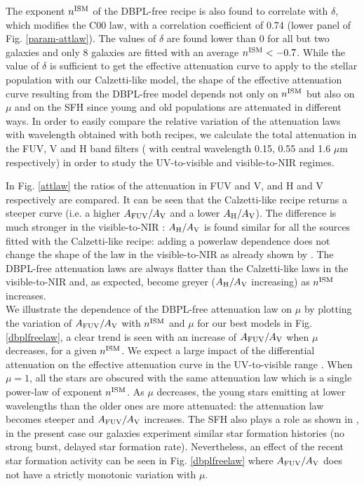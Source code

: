 \documentclass{aa}
\begin{document}
The exponent $n^{\rm ISM}$ of the DBPL-free recipe is also found to correlate with $\delta$,  which modifies the C00 law, with a correlation coefficient of 0.74 (lower panel of Fig. \ref{param-attlaw}). The  values of $\delta$ are found lower than 0 for all but two galaxies and  only 8  galaxies  are fitted with  an average $n^{\rm ISM} <-0.7$.
While the value of $\delta$ is sufficient to  get  the effective attenuation curve to apply to  the stellar population with our Calzetti-like model, the shape of the effective attenuation  curve resulting from the DBPL-free model depends not only on  $n^{\rm ISM}$ but also on  $\mu$  and on the SFH since  young and old populations are attenuated in different ways. In order to easily  compare the relative variation of the attenuation laws with wavelength obtained with both recipes, we calculate the total attenuation in the FUV, V and H band filters ( with central wavelength  0.15, 0.55 and 1.6 $\mu$m respectively) in order to study  the UV-to-visible and visible-to-NIR    regimes.

In Fig. \ref{attlaw}  the ratios of the attenuation in FUV and V, and H and V respectively are compared.  
It can be seen that the Calzetti-like recipe returns a steeper curve (i.e. a higher $A_{\rm FUV}/A_{\rm V}$ and a lower $A_{\rm H}/A_{\rm V}$). The difference is much  stronger in the visible-to-NIR : $A_{\rm H}/A_{\rm V}$ is found similar  for all the sources fitted with the Calzetti-like recipe: adding a powerlaw dependence does not change the shape of the law in the visible-to-NIR  as  already shown by \citet{LoFaro17}. 
The DBPL-free attenuation laws are  always flatter than the Calzetti-like  laws  in the visible-to-NIR  and, as expected, become greyer ($A_{\rm H}/A_{\rm V}$ increasing) as  $n^{\rm ISM}$ increases.\\
We illustrate the dependence of the DBPL-free attenuation law on $\mu$  by plotting the variation of $A_{\rm FUV}/A_{\rm V}$  with $n^{\rm ISM}$ and $\mu$  for our best models in Fig. \ref{dbplfreelaw}, a clear trend is seen with an increase of  $A_{\rm FUV}/A_{\rm V}$  when $\mu$ decreases, for a given  $n^{\rm ISM}$. We expect a large impact of the differential attenuation on the effective attenuation curve in the UV-to-visible range \citep[e.g.,][]{Inoue05}. When $\mu = 1$, all the stars are obscured with the same  attenuation law which  is a single power-law of exponent $n^{\rm ISM}$. As  $\mu$ decreases, the young stars emitting at lower wavelengths than the older ones are more attenuated: the attenuation law becomes steeper  and $A_{\rm FUV}/A_{\rm V}$ increases. The SFH  also plays a role as shown in \citet{Charlot00}, in the present case our galaxies experiment similar  star formation histories (no strong burst, delayed star formation rate). Nevertheless,  an  effect of the recent star formation activity  can be seen in Fig. \ref{dbplfreelaw} where  $A_{\rm FUV}/A_{\rm V}$ does not have a strictly monotonic variation   with $\mu$.
\end{document}
